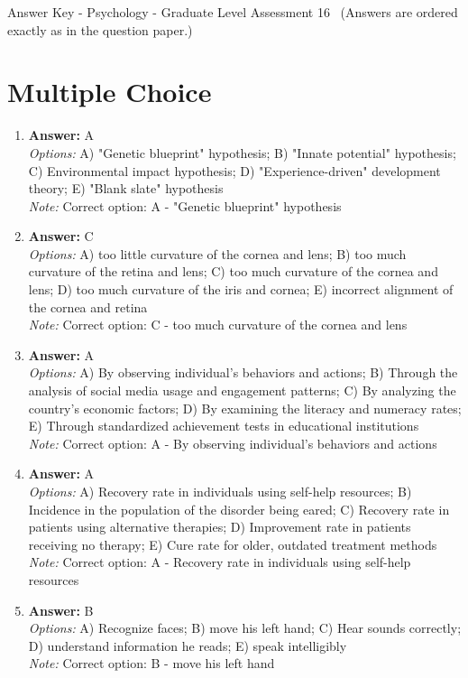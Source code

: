 \documentclass[12pt]{article}
\begin{document}
\begin{center}
Answer Key - Psychology - Graduate Level Assessment 16 \
\small (Answers are ordered exactly as in the question paper.)
\end{center}

\section*{Multiple Choice}
\begin{enumerate}[label=\arabic*.]
\item \textbf{Answer:} A
\\ \textit{Options:} A) "Genetic blueprint" hypothesis; B) "Innate potential" hypothesis; C) Environmental impact hypothesis; D) "Experience-driven" development theory; E) "Blank slate" hypothesis
\\ \textit{Note:} Correct option: A - "Genetic blueprint" hypothesis
\item \textbf{Answer:} C
\\ \textit{Options:} A) too little curvature of the cornea and lens; B) too much curvature of the retina and lens; C) too much curvature of the cornea and lens; D) too much curvature of the iris and cornea; E) incorrect alignment of the cornea and retina
\\ \textit{Note:} Correct option: C - too much curvature of the cornea and lens
\item \textbf{Answer:} A
\\ \textit{Options:} A) By observing individual's behaviors and actions; B) Through the analysis of social media usage and engagement patterns; C) By analyzing the country's economic factors; D) By examining the literacy and numeracy rates; E) Through standardized achievement tests in educational institutions
\\ \textit{Note:} Correct option: A - By observing individual's behaviors and actions
\item \textbf{Answer:} A
\\ \textit{Options:} A) Recovery rate in individuals using self-help resources; B) Incidence in the population of the disorder being eared; C) Recovery rate in patients using alternative therapies; D) Improvement rate in patients receiving no therapy; E) Cure rate for older, outdated treatment methods
\\ \textit{Note:} Correct option: A - Recovery rate in individuals using self-help resources
\item \textbf{Answer:} B
\\ \textit{Options:} A) Recognize faces; B) move his left hand; C) Hear sounds correctly; D) understand information he reads; E) speak intelligibly
\\ \textit{Note:} Correct option: B - move his left hand
\end{enumerate}
\end{document}
